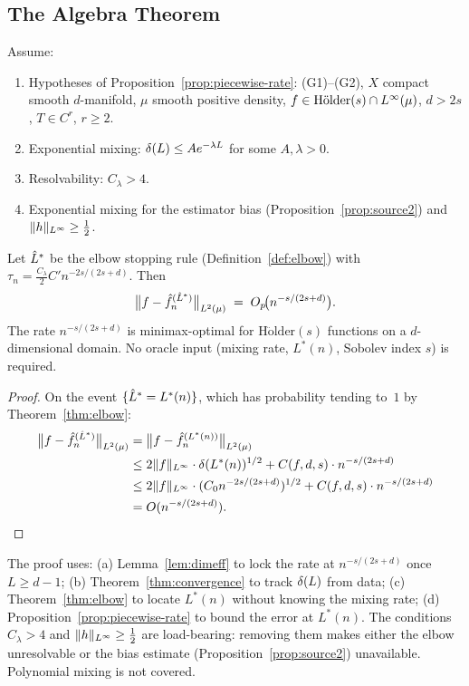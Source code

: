 \subsection{The Algebra Theorem}

\begin{theorem}
\label{thm:algebra}
Assume:
\begin{enumerate}[label=(\roman*)]
  \item Hypotheses of Proposition~\ref{prop:piecewise-rate}:
    (G1)--(G2), $X$ compact smooth $d$-manifold, $\mu$ smooth positive density,
    $f \in \mathrm{H\ddot{o}lder}(s) \cap L^{\infty}(\mu)$, $d > 2s$, $T \in C^r$, $r \geq 2$.
  \item Exponential mixing: $\delta(L) \leq A e^{-\lambda L}$ for some $A, \lambda > 0$.
  \item Resolvability: $C_\lambda > 4$.
  \item Exponential mixing for the estimator bias (Proposition~\ref{prop:source2})
    and $\|h\|_{L^{\infty}} \geq \frac{1}{2}$.
\end{enumerate}
Let $\hat{L}^*$ be the elbow stopping rule (Definition~\ref{def:elbow}) with
$\tau_n = \frac{C_\lambda}{2} C' n^{-2s/(2s+d)}$.
Then
\[
  \bigl\|f - \hat{f}_n^{(\hat{L}^*)}\bigr\|_{L^{2}(\mu)}
  \;=\; O_p\!\bigl(n^{-s/(2s+d)}\bigr).
\]
The rate $n^{-s/(2s+d)}$ is minimax-optimal for $\mathrm{H\ddot{o}lder}(s)$
functions on a $d$-dimensional domain.
No oracle input (mixing rate, $L^*(n)$, Sobolev index $s$) is required.
\end{theorem}

\begin{proof}
On the event $\{\hat{L}^* = L^*(n)\}$, which has probability tending to~$1$ by
Theorem~\ref{thm:elbow}:
\begin{align*}
  \bigl\|f - \hat{f}_n^{(\hat{L}^*)}\bigr\|_{L^{2}(\mu)}
  &= \bigl\|f - \hat{f}_n^{(L^*(n))}\bigr\|_{L^{2}(\mu)} \\
  &\leq 2\|f\|_{L^{\infty}} \cdot \delta(L^*(n))^{1/2}
    + C(f,d,s) \cdot n^{-s/(2s+d)} \\
  &\leq 2\|f\|_{L^{\infty}} \cdot (C_0 n^{-2s/(2s+d)})^{1/2}
    + C(f,d,s) \cdot n^{-s/(2s+d)} \\
  &= O(n^{-s/(2s+d)}). \qedhere
\end{align*}
\end{proof}

\begin{remark}
The proof uses: (a) Lemma~\ref{lem:dimeff} to lock the rate at $n^{-s/(2s+d)}$
once $L \geq d-1$; (b) Theorem~\ref{thm:convergence} to track $\delta(L)$ from
data; (c) Theorem~\ref{thm:elbow} to locate $L^*(n)$ without knowing the
mixing rate; (d) Proposition~\ref{prop:piecewise-rate} to bound the error
at $L^*(n)$.
The conditions $C_\lambda > 4$ and $\|h\|_{L^{\infty}} \geq \frac{1}{2}$ are load-bearing:
removing them makes either the elbow unresolvable or the bias estimate
(Proposition~\ref{prop:source2}) unavailable.
Polynomial mixing is not covered.
\end{remark}

